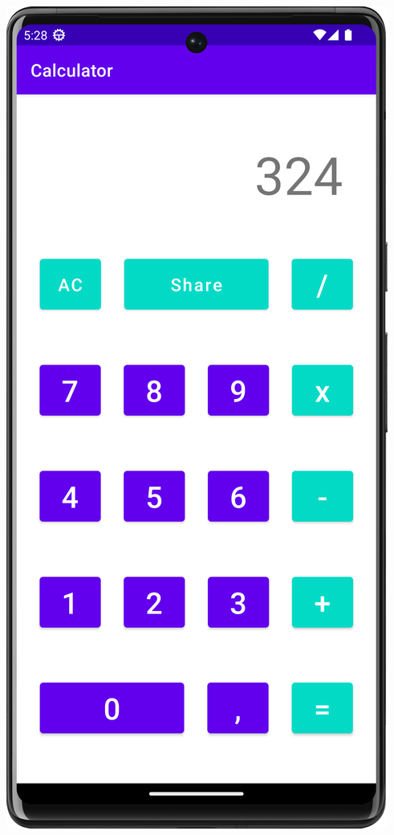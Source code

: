 \documentclass{\ClassPath/viu-tfm-template}
\begin{document}
{\begin{minipage}{0.4\linewidth}
    \end{minipage}
    \hfill
    \begin{minipage}{0.4\linewidth}
        \includegraphics[width=\linewidth]{img/phone2.png}
    \end{minipage}
}
\end{document}
